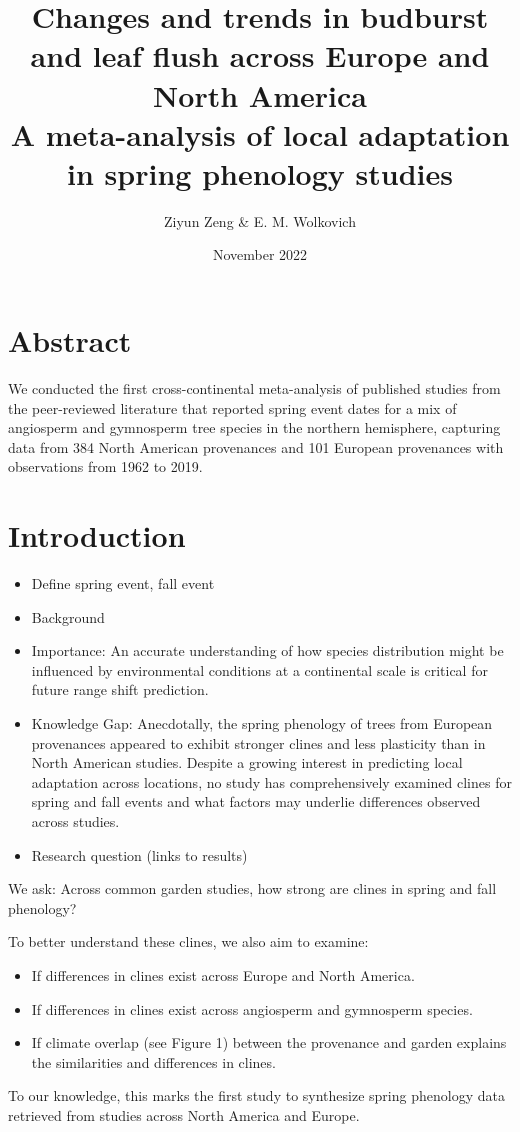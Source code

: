 \documentclass{article}
\begin{document}
\title{{\huge Changes and trends in budburst and leaf flush across Europe and North America} \\A meta-analysis of local adaptation in spring phenology studies}
\author{Ziyun Zeng \& E. M. Wolkovich}
\date{November 2022}
\maketitle 


\newpage

\section*{Abstract}


We conducted the first cross-continental meta-analysis of published studies from the peer-reviewed literature that reported spring event dates for a mix of angiosperm and gymnosperm tree species in the northern hemisphere, capturing data from 384 North American provenances and 101 European provenances with observations from 1962 to 2019.


\section{Introduction}
\begin{itemize}
\item Define spring event, fall event
\item Background
\item Importance: An accurate understanding of how species distribution might be influenced by environmental conditions at a continental scale is critical for future range shift prediction. 
\item Knowledge Gap: Anecdotally, the spring phenology of trees from European provenances appeared to exhibit stronger clines and less plasticity than in North American studies. Despite a growing interest in predicting local adaptation across locations, no study has comprehensively examined clines for spring and fall events and what factors may underlie differences observed across studies.
\item Research question (links to results)
\end{itemize}

We ask: Across common garden studies, how strong are clines in spring and fall phenology?

To better understand these clines, we also aim to examine:
\begin{itemize}
\item If differences in clines exist across Europe and North America.
\item If differences in clines exist across angiosperm and gymnosperm species.
\item If climate overlap (see Figure 1) between the provenance and garden explains the similarities and differences in clines.
\end{itemize}
To our knowledge, this marks the first study to synthesize spring phenology data retrieved from studies across North America and Europe. 
\end{document}
